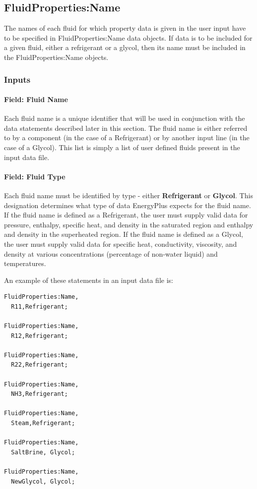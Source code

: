 \subsection{FluidProperties:Name}\label{fluidpropertiesname}

The names of each fluid for which property data is given in the user input have to be specified in FluidProperties:Name data objects. If data is to be included for a given fluid, either a refrigerant or a glycol, then its name must be included in the FluidProperties:Name objects.

\subsubsection{Inputs}\label{inputs-020}

\paragraph{Field: Fluid Name}\label{field-fluid-name}

Each fluid name is a unique identifier that will be used in conjunction with the data statements described later in this section. The fluid name is either referred to by a component (in the case of a Refrigerant) or by another input line (in the case of a Glycol). This list is simply a list of user defined fluids present in the input data file.

\paragraph{Field: Fluid Type}\label{field-fluid-type}

Each fluid name must be identified by type - either \textbf{Refrigerant} or \textbf{Glycol}. This designation determines what type of data EnergyPlus expects for the fluid name. If the fluid name is defined as a Refrigerant, the user must supply valid data for pressure, enthalpy, specific heat, and density in the saturated region and enthalpy and density in the superheated region. If the fluid name is defined as a Glycol, the user must supply valid data for specific heat, conductivity, viscosity, and density at various concentrations (percentage of non-water liquid) and temperatures.

An example of these statements in an input data file is:

\begin{lstlisting}
FluidProperties:Name,
  R11,Refrigerant;

FluidProperties:Name,
  R12,Refrigerant;

FluidProperties:Name,
  R22,Refrigerant;

FluidProperties:Name,
  NH3,Refrigerant;

FluidProperties:Name,
  Steam,Refrigerant;

FluidProperties:Name,
  SaltBrine, Glycol;

FluidProperties:Name,
  NewGlycol, Glycol;
\end{lstlisting}

